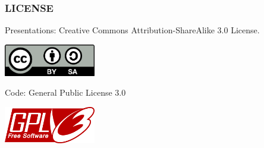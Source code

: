 \documentclass[ignorenonframetext,]{beamer}
\begin{document}
\begin{frame}\frametitle{LICENSE}

\begin{block}{Presentations: Creative Commons Attribution-ShareAlike 3.0
License.}

\centering
\includegraphics[keepaspectratio, width=0.3\textwidth]{graphics/cc-by-sa.png}

\end{block}

\begin{block}{Code: General Public License 3.0}

\centering
\includegraphics[keepaspectratio, width=0.3\textwidth]{graphics/gpl3.png}

\end{block}

\end{frame}
\end{document}
